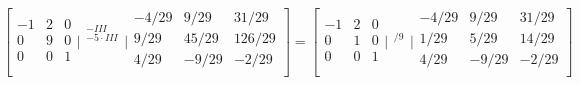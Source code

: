 $$
\left[
\begin{array}{rrr}
-1 & 2 & 0 \\
  0 & 9 &  0 \\
  0 & 0 & 1 \\
\end{array} \Bigg|
\begin{array}{ccc}
  _{-III} \\
  _{-5\cdot{III}} \\
  _{} \\
\end{array}
\Bigg| \begin{array}{rrr}
  -4/29 & 9/29 & 31/29 \\
  9/29 & 45/29 & 126/29 \\
  4/29 & -9/29 & -2/29 \\
\end{array} \right] = \left[
\begin{array}{rrr}
-1 & 2 & 0 \\
  0 & 1 &  0 \\
  0 & 0 & 1 \\
\end{array} \Bigg|
\begin{array}{ccc}
  _{} \\
  _{/9} \\
  _{} \\
\end{array}
\Bigg| \begin{array}{rrr}
  -4/29 & 9/29 & 31/29 \\
  1/29 & 5/29 & 14/29 \\
  4/29 & -9/29 & -2/29 \\
\end{array} \right]
$$

